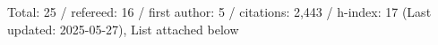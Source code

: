 Total: 25 / refereed: 16 / first author: 5 / citations: 2,443 / h-index: 17 (Last updated: 2025-05-27), List attached below